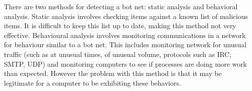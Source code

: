 \documentclass[9pt,a4paper]{article}
\begin{document}
There are two methods for detecting a bot net: static analysis and behavioral analysis. Static analysis involves checking items against a known list of malicious items. It is difficult to keep this list up to date, making this method not very effective. Behavioural analysis involves monitoring communications in a network for behaviour similar to a bot net. This includes  monitoring network for unusual traffic (such as at unusual times, of unusual volume, protocols such as IRC, SMTP, UDP) and monitoring computers to see if processes are doing more work than expected. However the problem with this method is that it may be legitimate for a computer to be exhibiting these behaviors.
\end{document}
